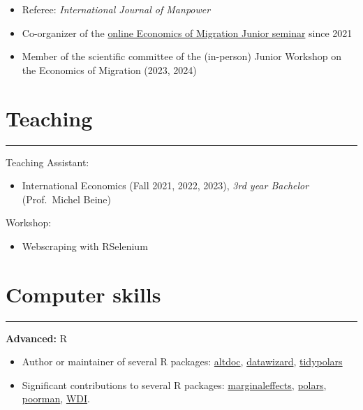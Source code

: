 \documentclass{article}
\newcommand{\sectionline}{%
  \vspace{-0.6cm}%
  \par\noindent\rule{\textwidth}{0.4pt}%
  \vspace{0.3cm}%
}
\let\xsection=\section
\renewcommand{\section}[1]{%
  \vspace{0.4cm}%
  \xsection*{#1}%
  \sectionline%
}
\def\tightlist{}
\begin{document}
\begin{itemize}
\item
  Referee: \emph{International Journal of Manpower}
\item
  Co-organizer of the
  \href{https://sites.google.com/view/the-economics-of-migration}{online
  Economics of Migration Junior seminar} since 2021
\item
  Member of the scientific committee of the (in-person) Junior Workshop
  on the Economics of Migration (2023, 2024)
\end{itemize}

\hypertarget{teaching}{%
\section{Teaching}\label{teaching}}

Teaching Assistant:

\begin{itemize}
\tightlist
\item
  International Economics (Fall 2021, 2022, 2023), \emph{3rd year
  Bachelor} (Prof.~Michel Beine)
\end{itemize}

Workshop:

\begin{itemize}
\tightlist
\item
  Webscraping with RSelenium
\end{itemize}

\hypertarget{computer-skills}{%
\section{Computer skills}\label{computer-skills}}

\textbf{Advanced:} R

\begin{itemize}
\item
  Author or maintainer of several R packages:
  \href{https://github.com/etiennebacher/altdoc}{altdoc},
  \href{https://easystats.github.io/datawizard/}{datawizard},
  \href{https://tidypolars.etiennebacher.com/}{tidypolars}
\item
  Significant contributions to several R packages:
  \href{https://vincentarelbundock.github.io/marginaleffects/}{marginaleffects},
  \href{https://rpolars.github.io/}{polars},
  \href{https://nathaneastwood.github.io/poorman/}{poorman},
  \href{https://vincentarelbundock.github.io/WDI/}{WDI}.
\end{itemize}
\end{document}
